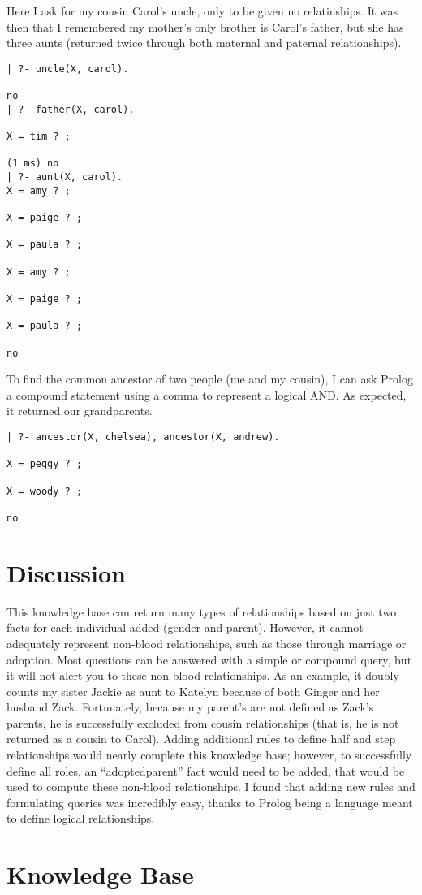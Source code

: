 \documentclass[12pt, article]{scrartcl}
\begin{document}
Here I ask for my cousin Carol's uncle, only to be given no relatinships. It was then that I remembered my mother's only brother is Carol's father, but she has three aunts (returned twice through both maternal and paternal relationships).
\begin{verbatim}
| ?- uncle(X, carol).

no
| ?- father(X, carol).

X = tim ? ;

(1 ms) no
| ?- aunt(X, carol).
X = amy ? ;

X = paige ? ;

X = paula ? ;

X = amy ? ;

X = paige ? ;

X = paula ? ;

no
\end{verbatim}

To find the common ancestor of two people (me and my cousin), I can ask Prolog a compound statement using a comma to represent a logical AND. As expected, it returned our grandparents.
\begin{verbatim}
| ?- ancestor(X, chelsea), ancestor(X, andrew).

X = peggy ? ;

X = woody ? ;

no
\end{verbatim}
\section{Discussion}
This knowledge base can return many types of relationships based on just two facts for each individual added (gender and parent). However, it cannot adequately represent non-blood relationships, such as those through marriage or adoption. Most questions can be answered with a simple or compound query, but it will not alert you to these non-blood relationships. As an example, it doubly counts my sister Jackie as aunt to Katelyn because of both Ginger and her husband Zack. Fortunately, because my parent's are not defined as Zack's parents, he is successfully excluded from cousin relationships (that is, he is not returned as a cousin to Carol). Adding additional rules to define half and step relationships would nearly complete this knowledge base; however, to successfully define all roles, an ``adoptedparent'' fact would need to be added, that would be used to compute these non-blood relationships. I found that adding new rules and formulating queries was incredibly easy, thanks to Prolog being a language meant to define logical relationships.

\pagebreak
\section{Knowledge Base}
\end{document}
